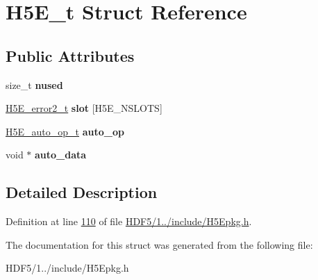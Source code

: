 \hypertarget{struct_h5_e__t}{}\section{H5\+E\+\_\+t Struct Reference}
\label{struct_h5_e__t}
\subsection*{Public Attributes}
\begin{DoxyCompactItemize}
\item 
\mbox{\label{struct_h5_e__t_aea24f14862a8ceeea969f275509111e7}} 
size\+\_\+t {\bfseries nused}
\item 
\mbox{\label{struct_h5_e__t_a9ae16afe5247ecbe3d5389a2fc8d0f81}} 
\hyperlink{struct_h5_e__error2__t}{H5\+E\+\_\+error2\+\_\+t} {\bfseries slot} \mbox{[}H5\+E\+\_\+\+N\+S\+L\+O\+TS\mbox{]}
\item 
\mbox{\label{struct_h5_e__t_aac95dceeac0eec63a2f43d013380bf91}} 
\hyperlink{struct_h5_e__auto__op__t}{H5\+E\+\_\+auto\+\_\+op\+\_\+t} {\bfseries auto\+\_\+op}
\item 
\mbox{\label{struct_h5_e__t_a0dea4e3c2c2db0c19a73725bcb757a65}} 
void $\ast$ {\bfseries auto\+\_\+data}
\end{DoxyCompactItemize}


\subsection{Detailed Description}


Definition at line \hyperlink{_h_d_f5_21_810_81_2include_2_h5_epkg_8h_source_l00110}{110} of file \hyperlink{_h_d_f5_21_810_81_2include_2_h5_epkg_8h_source}{H\+D\+F5/1../include/\+H5\+Epkg.\+h}.



The documentation for this struct was generated from the following file\+:\begin{DoxyCompactItemize}
\item 
H\+D\+F5/1../include/\+H5\+Epkg.\+h\end{DoxyCompactItemize}
